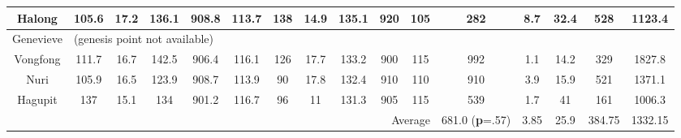 \documentclass[a4paper, 12pt]{article}
\begin{document}
{\begin{table}[!htpb]
\begin{center}
\begin{tabular}{c||c|c|c|c|c||c|c|c|c|c||c|c|c||c|c|}
\hline
\multicolumn{1}{|c||}{Halong} & 105.6 & 17.2 & 136.1 & 908.8 & 113.7 & 138 & 14.9 & 135.1 & 920 & 105 & 282 & 8.7 & 32.4 & 528 & 1123.4\\
\hline
\multicolumn{1}{|c||}{Genevieve} & \multicolumn{15}{|l|}{(genesis point not available)}\\
\hline
\multicolumn{1}{|c||}{Vongfong} & 111.7 & 16.7 & 142.5 & 906.4 & 116.1 & 126 & 17.7 & 133.2 & 900 & 115 & 992 & 1.1 & 14.2 & 329  & 1827.8\\
\hline
\multicolumn{1}{|c||}{Nuri} & 105.9 & 16.5 & 123.9 & 908.7 & 113.9 & 90 & 17.8 & 132.4 & 910 & 110 & 910 & 3.9 & 15.9 & 521  & 1371.1\\
\hline
\multicolumn{1}{|c||}{Hagupit} & 137 & 15.1 & 134 & 901.2 & 116.7 & 96 & 11 & 131.3 & 905 & 115 & 539 & 1.7 & 41 & 161 & 1006.3\\\hline\hline
\multicolumn{11}{|r||}{Average}&\multicolumn{1}{|m{.2in}|}{\vspace{.1in} 681.0 \hspace{.5in} ({\bf p}=.57)} &3.85&25.9&384.75&1332.15\\\hline
\end{tabular}
\end{center}
\end{table}


\newpage

}
\end{document}
